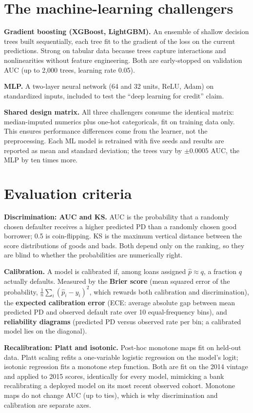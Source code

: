 \documentclass[a4paper,11pt]{article}
\newcommand{\term}[1]{\textbf{#1}}
\begin{document}
\section{The machine-learning challengers}

\term{Gradient boosting (XGBoost, LightGBM).} An ensemble of shallow decision trees built sequentially, each tree fit to the gradient of the loss on the current predictions. Strong on tabular data because trees capture interactions and nonlinearities without feature engineering. Both are early-stopped on validation AUC (up to 2{,}000 trees, learning rate 0.05).

\term{MLP.} A two-layer neural network (64 and 32 units, ReLU, Adam) on standardized inputs, included to test the ``deep learning for credit'' claim.

\term{Shared design matrix.} All three challengers consume the identical matrix: median-imputed numerics plus one-hot categoricals, fit on training data only. This ensures performance differences come from the learner, not the preprocessing. Each ML model is retrained with five seeds and results are reported as mean and standard deviation; the trees vary by $\pm 0.0005$ AUC, the MLP by ten times more.

\section{Evaluation criteria}

\term{Discrimination: AUC and KS.} AUC is the probability that a randomly chosen defaulter receives a higher predicted PD than a randomly chosen good borrower; 0.5 is coin-flipping. KS is the maximum vertical distance between the score distributions of goods and bads. Both depend only on the ranking, so they are blind to whether the probabilities are numerically right.

\term{Calibration.} A model is calibrated if, among loans assigned $\hat p\approx q$, a fraction $q$ actually defaults. Measured by the \term{Brier score} (mean squared error of the probability, $\frac1n\sum_i(\hat p_i-y_i)^2$, which rewards both calibration and discrimination), the \term{expected calibration error} (ECE: average absolute gap between mean predicted PD and observed default rate over 10 equal-frequency bins), and \term{reliability diagrams} (predicted PD versus observed rate per bin; a calibrated model lies on the diagonal).

\term{Recalibration: Platt and isotonic.} Post-hoc monotone maps fit on held-out data. Platt scaling refits a one-variable logistic regression on the model's logit; isotonic regression fits a monotone step function. Both are fit on the 2014 vintage and applied to 2015 scores, identically for every model, mimicking a bank recalibrating a deployed model on its most recent observed cohort. Monotone maps do not change AUC (up to ties), which is why discrimination and calibration are separate axes.
\end{document}
